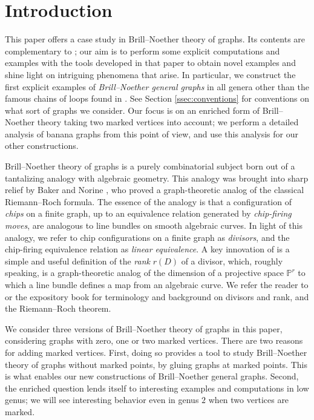 \section{Introduction}
This paper offers a case study in Brill--Noether theory of graphs. Its contents are complementary to \cite{Pfl22}; our aim is to perform some explicit computations and examples with the tools developed in that paper to obtain novel examples and shine light on intriguing phenomena that arise. In particular, we construct the first explicit examples of \emph{Brill--Noether general graphs} in all genera other than the famous chains of loops found in \cite{CDPR12}. 
See Section \ref{ssec:conventions} for conventions on what sort of graphs we consider.
Our focus is on an enriched form of Brill--Noether theory taking two marked vertices into account; we perform a detailed analysis of banana graphs from this point of view, and use this analysis for our other constructions.

Brill--Noether theory of graphs is a purely combinatorial subject born out of a tantalizing analogy with algebraic geometry. This analogy was brought into sharp relief by Baker and Norine \cite{BakNor07}, who proved a graph-theoretic analog of the classical Riemann--Roch formula. The essence of the analogy is that a configuration of \emph{chips} on a finite graph, up to an equivalence relation generated by \emph{chip-firing moves}, are analogous to line bundles on smooth algebraic curves. In light of this analogy, we refer to chip configurations on a finite graph as \emph{divisors}, and the chip-firing equivalence relation as \emph{linear equivalence}. A key innovation of \cite{BakNor07} is a simple and useful definition of the \emph{rank} $r(D)$ of a divisor, which, roughly speaking, is a graph-theoretic analog of the dimension of a projective space $\mathbb{P}^r$ to which a line bundle defines a map from an algebraic curve. We refer the reader to \cite{BakNor07} or the expository book \cite{corry2018divisors} for terminology and background on divisors and rank, and the Riemann--Roch theorem.

We consider three versions of Brill--Noether theory of graphs in this paper, considering graphs with zero, one or two marked vertices. There are two reasons for adding marked vertices. First, doing so provides a tool to study Brill--Noether theory of graphs without marked points, by gluing graphs at marked points. This is what enables our new constructions of Brill--Noether general graphs. Second, the enriched question lends itself to interesting examples and computations in low genus; we will see interesting behavior even in genus $2$ when two vertices are marked.

